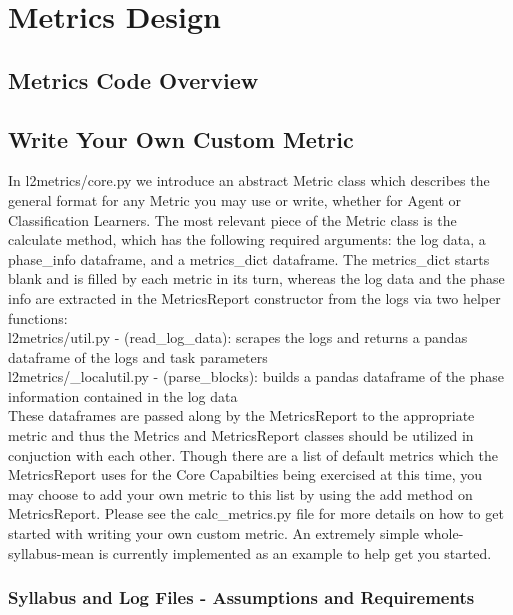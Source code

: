 \chapter{Metrics Design}\label{ch:metrics_design}

\section{Metrics Code Overview} 

\section{Write Your Own Custom Metric}

In l2metrics/core.py we introduce an abstract Metric class which describes the general format for any Metric you may use or write, whether for Agent or Classification Learners. The most relevant piece of the Metric class is the calculate method, which has the following required arguments: the log data, a phase\_info dataframe, and a metrics\_dict dataframe. The metrics\_dict starts blank and is filled by each metric in its turn, whereas the log data and the phase info are extracted in the MetricsReport constructor from the logs via two helper functions: \\[0.1in]

l2metrics/util.py - (read\_log\_data): scrapes the logs and returns a pandas dataframe of the logs and task parameters\\
l2metrics/\_localutil.py - (parse\_blocks): builds a pandas dataframe of the phase information contained in the log data\\[0.1in]

These dataframes are passed along by the MetricsReport to the appropriate metric and thus the Metrics and MetricsReport classes should be utilized in conjuction with each other. Though there are a list of default metrics which the MetricsReport uses for the Core Capabilties being exercised at this time, you may choose to add your own metric to this list by using the add method on MetricsReport. Please see the calc\_metrics.py file for more details on how to get started with writing your own custom metric. An extremely simple whole-syllabus-mean is currently implemented as an example to help get you started.


\subsection*{Syllabus and Log Files - Assumptions and Requirements}


